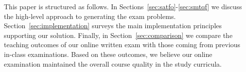 This paper is structured as follows. In Sections~\ref{sec:satfo}-\ref{sec:smtqf}
we discuss the high-level approach to generating the exam
problems. Section~\ref{sec:implementation} surveys the main implementation principles supporting our
solution.
Finally, in Section~\ref{sec:comparison} we compare
the teaching outcomes of our online written exam with those coming
from previous in-class examinations. Based on these outcomes,
we believe our online examination maintained the overall course
quality in the study curricula. 
